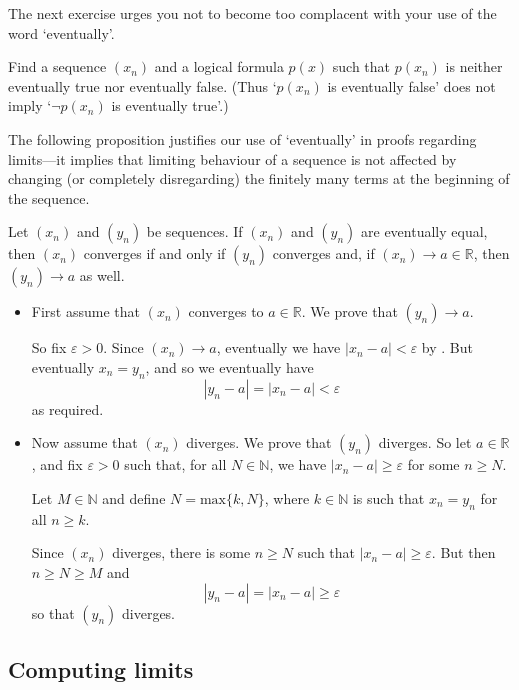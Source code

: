The next exercise urges you not to become too complacent with your use of the word `eventually'.

\begin{exercise}
Find a sequence $(x_n)$ and a logical formula $p(x)$ such that $p(x_n)$ is neither eventually true nor eventually false. (Thus `$p(x_n)$ is eventually false' does not imply `$\neg p(x_n)$ is eventually true'.)
\end{exercise}

The following proposition justifies our use of `eventually' in proofs regarding limits---it implies that limiting behaviour of a sequence is not affected by changing (or completely disregarding) the finitely many terms at the beginning of the sequence.

\begin{theorem}
Let $(x_n)$ and $(y_n)$ be sequences. If $(x_n)$ and $(y_n)$ are eventually equal, then $(x_n)$ converges if and only if $(y_n)$ converges and, if $(x_n) \to a \in \mathbb{R}$, then $(y_n) \to a$ as well.
\end{theorem}

\begin{cproof}
\fixlistskip
\begin{itemize}
\item First assume that $(x_n)$ converges to $a \in \mathbb{R}$. We prove that $(y_n) \to a$.

So fix $\varepsilon > 0$. Since $(x_n) \to a$, eventually we have $|x_n - a| < \varepsilon$ by . But eventually $x_n = y_n$, and so we eventually have
\[ |y_n - a| = |x_n - a| < \varepsilon \]
as required.

\item Now assume that $(x_n)$ diverges. We prove that $(y_n)$ diverges. So let $a \in \mathbb{R}$, and fix $\varepsilon > 0$ such that, for all $N \in \mathbb{N}$, we have $|x_n - a| \ge \varepsilon$ for some $n \ge N$.

Let $M \in \mathbb{N}$ and define $N = \mathrm{max} \{ k, N \}$, where $k \in \mathbb{N}$ is such that $x_n=y_n$ for all $n \ge k$.

Since $(x_n)$ diverges, there is some $n \ge N$ such that $|x_n - a| \ge \varepsilon$. But then $n \ge N \ge M$ and
\[ |y_n - a| = |x_n - a| \ge \varepsilon \]
so that $(y_n)$ diverges.
\end{itemize}
\end{cproof}

\subsection*{Computing limits}


